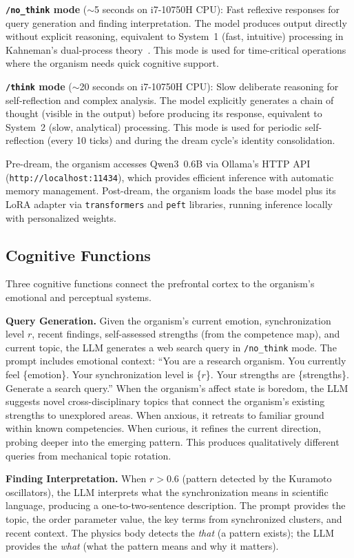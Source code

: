 \documentclass[11pt,a4paper,twocolumn]{article}
\begin{document}
\textbf{\texttt{/no\_think} mode} ($\sim$5 seconds on i7-10750H CPU): Fast reflexive responses for query generation and finding interpretation.
The model produces output directly without explicit reasoning, equivalent to System~1 (fast, intuitive) processing in Kahneman's dual-process theory~\cite{kahneman2011}.
This mode is used for time-critical operations where the organism needs quick cognitive support.

\textbf{\texttt{/think} mode} ($\sim$20 seconds on i7-10750H CPU): Slow deliberate reasoning for self-reflection and complex analysis.
The model explicitly generates a chain of thought (visible in the output) before producing its response, equivalent to System~2 (slow, analytical) processing.
This mode is used for periodic self-reflection (every 10 ticks) and during the dream cycle's identity consolidation.

Pre-dream, the organism accesses Qwen3~0.6B via Ollama's HTTP API (\texttt{http://localhost:11434}), which provides efficient inference with automatic memory management.
Post-dream, the organism loads the base model plus its LoRA adapter via \texttt{transformers} and \texttt{peft} libraries, running inference locally with personalized weights.

\subsection{Cognitive Functions}

Three cognitive functions connect the prefrontal cortex to the organism's emotional and perceptual systems.

\textbf{Query Generation.}
Given the organism's current emotion, synchronization level $r$, recent findings, self-assessed strengths (from the competence map), and current topic, the LLM generates a web search query in \texttt{/no\_think} mode.
The prompt includes emotional context: ``You are a research organism.
You currently feel \{emotion\}.
Your synchronization level is \{$r$\}.
Your strengths are \{strengths\}.
Generate a search query.''
When the organism's affect state is boredom, the LLM suggests novel cross-disciplinary topics that connect the organism's existing strengths to unexplored areas.
When anxious, it retreats to familiar ground within known competencies.
When curious, it refines the current direction, probing deeper into the emerging pattern.
This produces qualitatively different queries from mechanical topic rotation.

\textbf{Finding Interpretation.}
When $r > 0.6$ (pattern detected by the Kuramoto oscillators), the LLM interprets what the synchronization means in scientific language, producing a one-to-two-sentence description.
The prompt provides the topic, the order parameter value, the key terms from synchronized clusters, and recent context.
The physics body detects the \emph{that} (a pattern exists); the LLM provides the \emph{what} (what the pattern means and why it matters).
\end{document}
